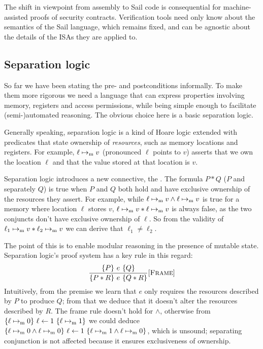 

The shift in viewpoint from assembly to Sail code is consequential for machine-assisted proofs of security contracts. Verification tools need only know about the semantics of the Sail language, which remains fixed, and can be agnostic about the details of the ISAs they are applied to.

\subsection{Separation logic}

So far we have been stating the pre- and postconditions informally. To make them more rigorous we need a language that can express properties involving memory, registers and access permissions, while being simple enough to facilitate (semi-)automated reasoning. The obvious choice here is a basic separation logic.

Generally speaking, separation logic is a kind of Hoare logic extended with predicates that state ownership of \emph{resources}, such as memory locations and registers. For example, \(\ell \mapsto_{\mathrm{m}} v\) (pronounced \(\ell\) points to \(v\)) asserts that we own the location \(\ell\) and that the value stored at that location is \(v\).

Separation logic introduces a new connective, the . The formula \(P \ast Q\) (\(P\) and separately \(Q\)) is true when \(P\) and \(Q\) both hold and have exclusive ownership of the resources they assert. For example, while \(\ell \mapsto_{\mathrm{m}} v \wedge \ell \mapsto_{\mathrm{m}} v\) is true for a memory where location \(\ell\) stores \(v\), \(\ell \mapsto_{\mathrm{m}} v \ast \ell \mapsto_{\mathrm{m}} v\) is always false, as the two conjuncts don't have exclusive ownership of \(\ell\). So from the validity of \(\ell_1 \mapsto_{\mathrm{m}} v \ast \ell_2 \mapsto_{\mathrm{m}} v\) we can derive that \(\ell_1 \neq \ell_2\).

The point of this is to enable modular reasoning in the presence of mutable state. Separation logic's proof system has a key rule in this regard:
\[ \frac{\hoare{P}{e}{Q}}{\hoare{P \ast R}{e}{Q \ast R}}[\textsc{Frame}] \]
Intuitively, from the premise we learn that \(e\) only requires the resources described by \(P\) to produce \(Q\); from that we deduce that it doesn't alter the resources described by \(R\). The frame rule doesn't hold for \(\wedge\), otherwise from \(\hoare{\ell \ptom 0}{\ell \leftarrow 1}{\ell \ptom 1}\) we could deduce \(\hoare{\ell \ptom 0 \wedge \ell \ptom 0}{\ell \leftarrow 1}{\ell \ptom 1 \wedge \ell \ptom 0}\), which is unsound; separating conjunction is not affected because it ensures exclusiveness of ownership.

